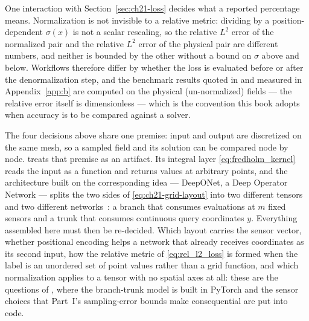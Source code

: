 One interaction with Section~\ref{sec:ch21-loss} decides what a reported percentage
means. Normalization is not invisible to a relative metric: dividing by a
position-dependent $\sigma(x)$ is not a scalar rescaling, so the relative $L^2$ error of
the normalized pair and the relative $L^2$ error of the physical pair are different
numbers, and neither is bounded by the other without a bound on $\sigma$ above and below.
Workflows therefore differ by whether the loss is evaluated before or after the
denormalization step, and the benchmark results quoted in
 and measured in
Appendix~\ref{app:b} are computed on the physical (un-normalized) fields --- the relative
error itself is dimensionless --- which is the convention this book adopts when
accuracy is to be compared against a solver.


\medskip
The four decisions above share one premise: input and output are discretized on the same
mesh, so a sampled field and its solution can be compared node by node.
 treats that premise as an
artifact. Its integral layer \eqref{eq:fredholm_kernel} reads the input as a function and
returns values at arbitrary points, and the architecture built on the corresponding
idea --- DeepONet, a Deep Operator Network --- splits the two sides of
\eqref{eq:ch21-grid-layout} into two different tensors and two different
networks~\cite{lu2021learning}: a branch that consumes evaluations at $m$ fixed sensors
and a trunk that consumes continuous query coordinates $y$. Everything assembled here
must then be re-decided. Which layout carries the sensor vector, whether positional
encoding helps a network that already receives coordinates as its second input, how the
relative metric of \eqref{eq:rel_l2_loss} is formed when the label is an unordered set of
point values rather than a grid function, and which normalization applies to a tensor
with no spatial axes at all: these are the questions of
, where the branch-trunk
model is built in PyTorch and the sensor choices that Part~I's sampling-error bounds
make consequential are put into code.
